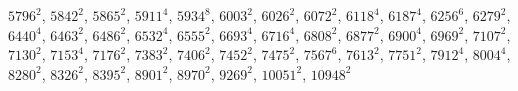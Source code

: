 \begin{itemize}
$5796^{2}$, $5842^{2}$, $5865^{2}$, $5911^{4}$, $5934^{8}$, $6003^{2}$, $6026^{2}$, $6072^{2}$, $6118^{4}$, $6187^{4}$, $6256^{6}$, $6279^{2}$, $6440^{4}$, $6463^{2}$, $6486^{2}$, $6532^{4}$, $6555^{2}$, $6693^{4}$, $6716^{4}$, $6808^{2}$, $6877^{2}$, $6900^{4}$, $6969^{2}$, $7107^{2}$, $7130^{2}$, $7153^{4}$, $7176^{2}$, $7383^{2}$, $7406^{2}$, $7452^{2}$, $7475^{2}$, $7567^{6}$, $7613^{2}$, $7751^{2}$, $7912^{4}$, $8004^{4}$, $8280^{2}$, $8326^{2}$, $8395^{2}$, $8901^{2}$, $8970^{2}$, $9269^{2}$, $10051^{2}$, $10948^{2}$
\end{itemize}
